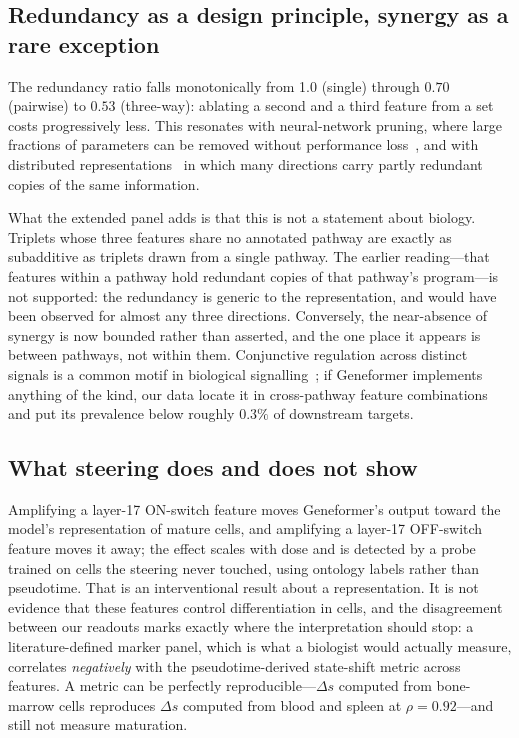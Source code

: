\documentclass[11pt,onecolumn]{article}
\begin{document}
\subsection{Redundancy as a design principle, synergy as a rare exception}

The redundancy ratio falls monotonically from 1.0 (single) through $0.70$ (pairwise) to $0.53$ (three-way): ablating a second and a third feature from a set costs progressively less. This resonates with neural-network pruning, where large fractions of parameters can be removed without performance loss~\citep{frankle2019lottery}, and with distributed representations~\citep{hinton1986distributed,olsson2022context} in which many directions carry partly redundant copies of the same information.

What the extended panel adds is that this is not a statement about biology. Triplets whose three features share no annotated pathway are exactly as subadditive as triplets drawn from a single pathway. The earlier reading---that features within a pathway hold redundant copies of that pathway's program---is not supported: the redundancy is generic to the representation, and would have been observed for almost any three directions. Conversely, the near-absence of synergy is now bounded rather than asserted, and the one place it appears is between pathways, not within them. Conjunctive regulation across distinct signals is a common motif in biological signalling~\citep{alon2007network}; if Geneformer implements anything of the kind, our data locate it in cross-pathway feature combinations and put its prevalence below roughly $0.3\%$ of downstream targets.

\subsection{What steering does and does not show}

Amplifying a layer-17 ON-switch feature moves Geneformer's output toward the model's representation of mature cells, and amplifying a layer-17 OFF-switch feature moves it away; the effect scales with dose and is detected by a probe trained on cells the steering never touched, using ontology labels rather than pseudotime. That is an interventional result about a representation. It is not evidence that these features control differentiation in cells, and the disagreement between our readouts marks exactly where the interpretation should stop: a literature-defined marker panel, which is what a biologist would actually measure, correlates \emph{negatively} with the pseudotime-derived state-shift metric across features. A metric can be perfectly reproducible---$\Delta s$ computed from bone-marrow cells reproduces $\Delta s$ computed from blood and spleen at $\rho=0.92$---and still not measure maturation.
\end{document}
